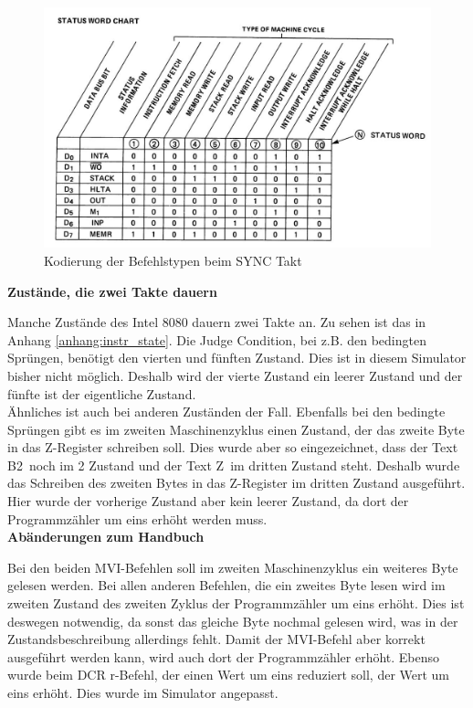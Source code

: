 \documentclass[12pt]{article}
\newcommand{\imgSpaceBefore}{\vspace{10pt}}
\begin{document}
\imgSpaceBefore
\begin{figure}[H]
\centering
\includegraphics[width=15cm]{Bilder/Intel8080_DataLines}
\caption{Kodierung der Befehlstypen beim SYNC Takt \cite{IntMan20}}
\label{fig:status_word}
\end{figure}

\noindent
\textbf{Zustände, die zwei Takte dauern}

\noindent
Manche Zustände des Intel 8080 dauern zwei Takte an. Zu sehen ist das in Anhang \ref{anhang:instr_state}. Die Judge Condition, bei z.B. den bedingten Sprüngen, benötigt den vierten und fünften Zustand. Dies ist in diesem Simulator bisher nicht möglich. Deshalb 
wird der vierte Zustand ein leerer Zustand und der fünfte ist der eigentliche Zustand. 
\\

\noindent
Ähnliches ist auch bei anderen Zuständen der Fall. Ebenfalls bei den bedingte Sprüngen gibt es im zweiten Maschinenzyklus einen Zustand, der das zweite Byte in das Z-Register schreiben soll. Dies wurde aber so eingezeichnet, dass der Text \glqq B2\grqq\ noch im 2 Zustand und der Text \glqq Z\grqq\ im dritten Zustand steht. Deshalb wurde das Schreiben des zweiten Bytes in das Z-Register im dritten Zustand ausgeführt. Hier wurde der vorherige Zustand aber kein leerer Zustand, da dort der Programmzähler um eins erhöht werden muss.
\\

\noindent
\textbf{Abänderungen zum Handbuch}

\noindent
Bei den beiden MVI-Befehlen soll im zweiten Maschinenzyklus ein weiteres Byte gelesen werden. Bei allen anderen Befehlen, die ein zweites Byte lesen wird im zweiten Zustand des zweiten Zyklus der Programmzähler um eins erhöht. Dies ist deswegen notwendig, da sonst das gleiche Byte nochmal gelesen wird, was in der Zustandsbeschreibung allerdings fehlt. Damit der MVI-Befehl aber korrekt ausgeführt werden kann, wird auch dort der Programmzähler erhöht. Ebenso wurde beim DCR r-Befehl, der einen Wert um eins reduziert soll, der Wert um eins erhöht. Dies wurde im Simulator angepasst.
\\
\end{document}
